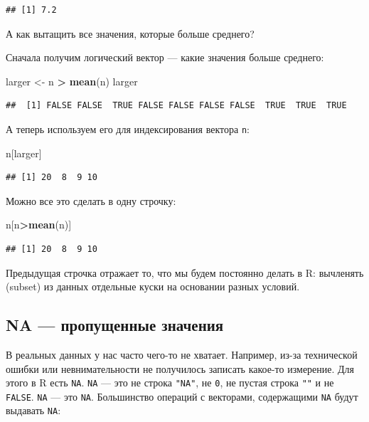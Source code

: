 \documentclass[]{book}
\newenvironment{Shaded}{\begin{snugshade}}{\end{snugshade}}
\newcommand{\KeywordTok}[1]{\textcolor[rgb]{0.13,0.29,0.53}{\textbf{#1}}}
\newcommand{\NormalTok}[1]{#1}
\newcommand{\OperatorTok}[1]{\textcolor[rgb]{0.81,0.36,0.00}{\textbf{#1}}}
\newcommand{\StringTok}[1]{\textcolor[rgb]{0.31,0.60,0.02}{#1}}
\begin{document}
\begin{verbatim}
## [1] 7.2
\end{verbatim}

А как вытащить все значения, которые больше среднего?

Сначала получим логический вектор --- какие значения больше среднего:

\begin{Shaded}
\begin{Highlighting}[]
\NormalTok{larger <-}\StringTok{ }\NormalTok{n }\OperatorTok{>}\StringTok{ }\KeywordTok{mean}\NormalTok{(n)}
\NormalTok{larger}
\end{Highlighting}
\end{Shaded}

\begin{verbatim}
##  [1] FALSE FALSE  TRUE FALSE FALSE FALSE FALSE  TRUE  TRUE  TRUE
\end{verbatim}

А теперь используем его для индексирования вектора \texttt{n}:

\begin{Shaded}
\begin{Highlighting}[]
\NormalTok{n[larger]}
\end{Highlighting}
\end{Shaded}

\begin{verbatim}
## [1] 20  8  9 10
\end{verbatim}

Можно все это сделать в одну строчку:

\begin{Shaded}
\begin{Highlighting}[]
\NormalTok{n[n}\OperatorTok{>}\KeywordTok{mean}\NormalTok{(n)]}
\end{Highlighting}
\end{Shaded}

\begin{verbatim}
## [1] 20  8  9 10
\end{verbatim}

Предыдущая строчка отражает то, что мы будем постоянно делать в R: вычленять (subset) из данных отдельные куски на основании разных условий.

\hypertarget{na}{%
\subsection{NA --- пропущенные значения}\label{na}}

В реальных данных у нас часто чего-то не хватает. Например, из-за технической ошибки или невнимательности не получилось записать какое-то измерение. Для этого в R есть \texttt{NA}. \texttt{NA} --- это не строка \texttt{"NA"}, не \texttt{0}, не пустая строка \texttt{""} и не \texttt{FALSE}. \texttt{NA} --- это \texttt{NA}.
Большинство операций с векторами, содержащими \texttt{NA} будут выдавать \texttt{NA}:
\end{document}
